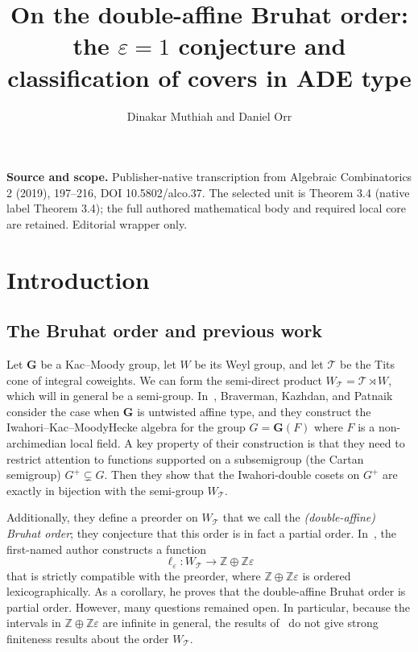 \documentclass[10pt]{amsart}
\title{On the double-affine Bruhat order: the $\varepsilon=1$ conjecture and classification of covers in ADE type}
\author{Dinakar Muthiah and Daniel Orr}
\newcommand{\equalenv}[2]{}
\newcommand{\eps}{\varepsilon}\newcommand{\ZZ}{\mathbb{Z}}\newcommand{\QQ}{\mathbb{Q}}\newcommand{\RR}{\mathbb{R}}\newcommand{\bB}{\mathbf{B}}\newcommand{\bG}{\mathbf{G}}\newcommand{\cO}{\mathcal{O}}\newcommand{\cS}{\mathcal{S}}\newcommand{\cT}{\mathcal{T}}\newcommand{\WTits}{W_{\cT}}\newcommand{\TitsCone}{\cT}\newcommand{\betacheck}{\beta^\vee}\newcommand{\Inv}{\operatorname{Inv}}\newcommand{\height}{\operatorname{ht}}\newcommand{\im}{\operatorname{image}}\newcommand{\sgn}{\operatorname{sgn}}\newcommand{\tDelta}{\widetilde{\Delta}}\newcommand{\Invplusplusx}{\Inv^{++}_x}\newcommand{\tr}{\widetilde{r}}\newcommand{\tn}{\widetilde{n}}\newcommand{\fl}{\mathfrak{l}}\newcommand{\fs}{\mathfrak{s}}\newcommand{\mk}{\mkern -1mu}\newcommand{\Mk}{\mkern -2mu}\newcommand{\mK}{\mkern 1mu}\newcommand{\MK}{\mkern 2mu}
\begin{document}
\maketitle
\noindent\textbf{Source and scope.} Publisher-native transcription from Algebraic Combinatorics 2 (2019), 197--216, DOI 10.5802/alco.37. The selected unit is Theorem 3.4 (native label Theorem 3.4); the full authored mathematical body and required local core are retained. Editorial wrapper only.




\section{Introduction}

\subsection{The Bruhat order and previous work}

Let $\bG$ be a Kac--Moody group, let $W$ be its Weyl group, and let $\cT$ be the Tits cone of integral coweights. We can form the semi-direct product $\WTits = \cT \rtimes W$, which will in general be a semi-group. In~\cite{BKP}, Braverman, Kazhdan, and Patnaik consider the case when $\bG$ is untwisted affine type, and they construct the Iwahori--Kac--MoodyHecke algebra for the group $G = \bG(F)$ where $F$ is a non-archimedian local field. A key property of their construction is that they need to restrict attention to functions supported on a subsemigroup (the Cartan semigroup) $G^+ \subsetneq G$. Then they show that the Iwahori-double cosets on $G^+$ are exactly in bijection with the semi-group $\WTits$.

Additionally, they define a preorder on $\WTits$ that we call the \emph{(double-affine) Bruhat order}; they conjecture that this order is in fact a partial order. In~\cite{M}, the first-named author constructs a function
\begin{equation}\label{eq:22}
\ell_{\eps} : \WTits \rightarrow \ZZ \oplus \ZZ \eps
\end{equation}
that is strictly compatible with the preorder, where $\ZZ \oplus \ZZ \eps$ is ordered lexicographically. As a corollary, he proves that the double-affine Bruhat order is partial order. However, many questions remained open. In particular, because the intervals in $\ZZ \oplus \ZZ \eps$ are infinite in general, the results of~\cite{M} do not give strong finiteness results about the order $\WTits$.
\end{document}
